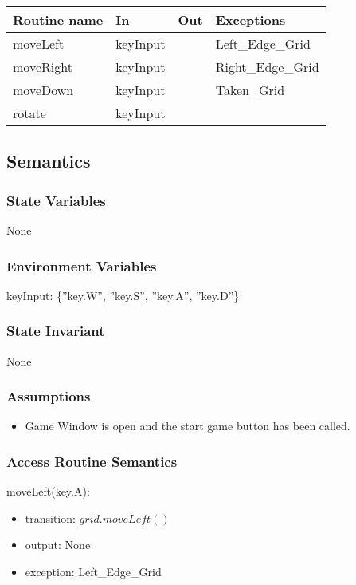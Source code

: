 \documentclass[12pt]{article}
\begin{document}
\begin{tabular}{| l | l | l | l |}
\hline
\textbf{Routine name} & \textbf{In} & \textbf{Out} & \textbf{Exceptions}\\
\hline
moveLeft & keyInput &  & Left\_Edge\_Grid \\
\hline
moveRight & keyInput  &  & Right\_Edge\_Grid \\
\hline
moveDown & keyInput &  & Taken\_Grid \\
\hline
rotate & keyInput &  & \\
\hline
\end{tabular}

\subsection* {Semantics}

\subsubsection* {State Variables}
None 
\subsubsection* {Environment Variables}
keyInput: \{”key.W”, ”key.S”, ”key.A”, ”key.D”\}

\subsubsection* {State Invariant}
None
\subsubsection* {Assumptions}
\begin{itemize}
    \item Game Window is open and the start game button has been called.
\end{itemize}

\subsubsection* {Access Routine Semantics}

\noindent moveLeft(key.A):
\begin{itemize}
\item transition: $grid.moveLeft()$
\item output: None
\item exception: Left\_Edge\_Grid
\end{itemize}
\end{document}
